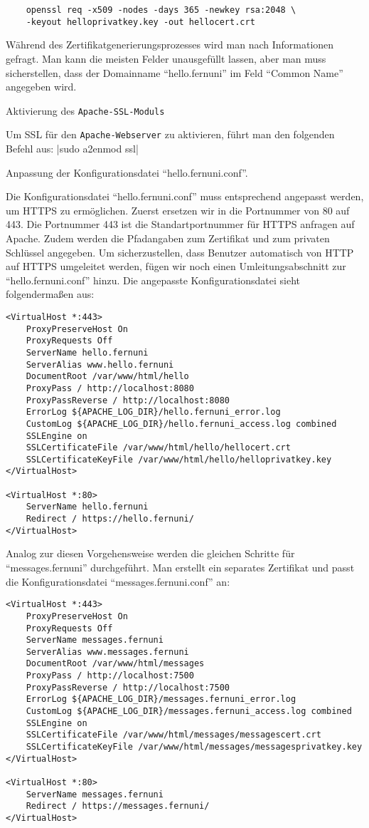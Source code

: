 \begin{verbatim}
    openssl req -x509 -nodes -days 365 -newkey rsa:2048 \
    -keyout helloprivatkey.key -out hellocert.crt
\end{verbatim}

Während des Zertifikatgenerierungsprozesses wird man nach Informationen gefragt. Man kann die meisten Felder unausgefüllt lassen, aber man muss sicherstellen, dass der Domainname \enquote{hello.fernuni} im Feld \enquote{Common Name} angegeben wird.

Aktivierung des \verb+Apache-SSL-Moduls+

Um SSL für den \verb+Apache-Webserver+ zu aktivieren, führt man den folgenden Befehl aus:
\mint{shell}|sudo a2enmod ssl|

Anpassung der Konfigurationsdatei \enquote{hello.fernuni.conf}.

Die Konfigurationsdatei \enquote{hello.fernuni.conf} muss entsprechend angepasst werden, um HTTPS zu ermöglichen. Zuerst ersetzen wir in die Portnummer von 80 auf 443. Die Portnummer 443 ist die Standartportnummer für HTTPS anfragen auf Apache. Zudem werden die Pfadangaben zum Zertifikat und zum privaten Schlüssel angegeben.
Um sicherzustellen, dass Benutzer automatisch von HTTP auf HTTPS umgeleitet werden, fügen wir noch einen Umleitungsabschnitt zur \enquote{hello.fernuni.conf} hinzu. Die angepasste Konfigurationsdatei sieht folgendermaßen aus:
\begin{verbatim}
<VirtualHost *:443>
    ProxyPreserveHost On
    ProxyRequests Off
    ServerName hello.fernuni
    ServerAlias www.hello.fernuni
    DocumentRoot /var/www/html/hello
    ProxyPass / http://localhost:8080
    ProxyPassReverse / http://localhost:8080
    ErrorLog ${APACHE_LOG_DIR}/hello.fernuni_error.log
    CustomLog ${APACHE_LOG_DIR}/hello.fernuni_access.log combined
    SSLEngine on
    SSLCertificateFile /var/www/html/hello/hellocert.crt
    SSLCertificateKeyFile /var/www/html/hello/helloprivatkey.key
</VirtualHost>

<VirtualHost *:80>
    ServerName hello.fernuni
    Redirect / https://hello.fernuni/
</VirtualHost>
\end{verbatim}

Analog zur diesen Vorgehensweise werden die gleichen Schritte für \enquote{messages.fernuni} durchgeführt. Man erstellt ein separates Zertifikat und passt die Konfigurationsdatei \enquote{messages.fernuni.conf} an:
\begin{verbatim}
<VirtualHost *:443>
    ProxyPreserveHost On
    ProxyRequests Off
    ServerName messages.fernuni
    ServerAlias www.messages.fernuni
    DocumentRoot /var/www/html/messages
    ProxyPass / http://localhost:7500
    ProxyPassReverse / http://localhost:7500
    ErrorLog ${APACHE_LOG_DIR}/messages.fernuni_error.log
    CustomLog ${APACHE_LOG_DIR}/messages.fernuni_access.log combined
    SSLEngine on
    SSLCertificateFile /var/www/html/messages/messagescert.crt
    SSLCertificateKeyFile /var/www/html/messages/messagesprivatkey.key
</VirtualHost>

<VirtualHost *:80>
    ServerName messages.fernuni
    Redirect / https://messages.fernuni/
</VirtualHost>
\end{verbatim}

